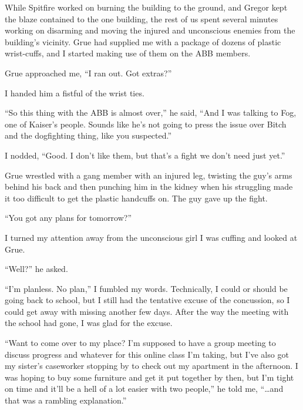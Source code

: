 While Spitfire worked on burning the building to the ground, and Gregor kept the blaze contained to the one building, the rest of us spent several minutes working on disarming and moving the injured and unconscious enemies from the building's vicinity.  Grue had supplied me with a package of dozens of plastic wrist-cuffs, and I started making use of them on the ABB members.



Grue approached me, ``I ran out.  Got extras?''



I handed him a fistful of the wrist ties.



``So this thing with the ABB is almost over,'' he said, ``And I was talking to Fog, one of Kaiser's people.  Sounds like he's not going to press the issue over Bitch and the dogfighting thing, like you suspected.''



I nodded, ``Good.  I don't like them, but that's a fight we don't need just yet.''



Grue wrestled with a gang member with an injured leg, twisting the guy's arms behind his back and then punching him in the kidney when his struggling made it too difficult to get the plastic handcuffs on.  The guy gave up the fight.



``You got any plans for tomorrow?''



I turned my attention away from the unconscious girl I was cuffing and looked at Grue.



``Well?'' he asked.



``I'm planless.  No plan,'' I fumbled my words.  Technically, I could or should be going back to school, but I still had the tentative excuse of the concussion, so I could get away with missing another few days.  After the way the meeting with the school had gone, I was glad for the excuse.



``Want to come over to my place?  I'm supposed to have a group meeting to discuss progress and whatever for this online class I'm taking, but I've also got my sister's caseworker stopping by to check out my apartment in the afternoon.  I was hoping to buy some furniture and get it put together by then, but I'm tight on time and it'll be a hell of a lot easier with two people,'' he told me, ``\ldots{}and that was a rambling explanation.''



